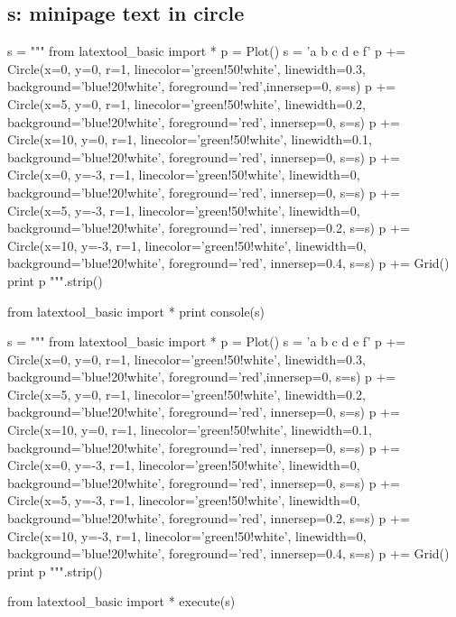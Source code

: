 \newpage
\subsection{s: minipage text in circle}
\begin{python}
s = """
from latextool_basic import *
p = Plot()
s = 'a b c d e f'
p += Circle(x=0, y=0, r=1, linecolor='green!50!white', linewidth=0.3, 
            background='blue!20!white', foreground='red',innersep=0, s=s)
p += Circle(x=5, y=0, r=1, linecolor='green!50!white', linewidth=0.2, 
            background='blue!20!white', foreground='red', innersep=0, s=s)
p += Circle(x=10, y=0, r=1, linecolor='green!50!white', linewidth=0.1, 
            background='blue!20!white', foreground='red', innersep=0, s=s)
p += Circle(x=0, y=-3, r=1, linecolor='green!50!white', linewidth=0, 
            background='blue!20!white', foreground='red', innersep=0, s=s)
p += Circle(x=5, y=-3, r=1, linecolor='green!50!white', linewidth=0, 
            background='blue!20!white', foreground='red', 
            innersep=0.2, s=s)
p += Circle(x=10, y=-3, r=1, linecolor='green!50!white', linewidth=0, 
            background='blue!20!white', foreground='red',
            innersep=0.4, s=s)
p += Grid()
print p
""".strip()

from latextool_basic import *
print console(s)
\end{python}
\begin{python}
s = """
from latextool_basic import *
p = Plot()
s = 'a b c d e f'
p += Circle(x=0, y=0, r=1, linecolor='green!50!white', linewidth=0.3, 
            background='blue!20!white', foreground='red',innersep=0, s=s)
p += Circle(x=5, y=0, r=1, linecolor='green!50!white', linewidth=0.2, 
            background='blue!20!white', foreground='red', innersep=0, s=s)
p += Circle(x=10, y=0, r=1, linecolor='green!50!white', linewidth=0.1, 
            background='blue!20!white', foreground='red', innersep=0, s=s)
p += Circle(x=0, y=-3, r=1, linecolor='green!50!white', linewidth=0, 
            background='blue!20!white', foreground='red', innersep=0, s=s)
p += Circle(x=5, y=-3, r=1, linecolor='green!50!white', linewidth=0, 
            background='blue!20!white', foreground='red', 
            innersep=0.2, s=s)
p += Circle(x=10, y=-3, r=1, linecolor='green!50!white', linewidth=0, 
            background='blue!20!white', foreground='red',
            innersep=0.4, s=s)
p += Grid()
print p
""".strip()

from latextool_basic import *
execute(s)
\end{python}




